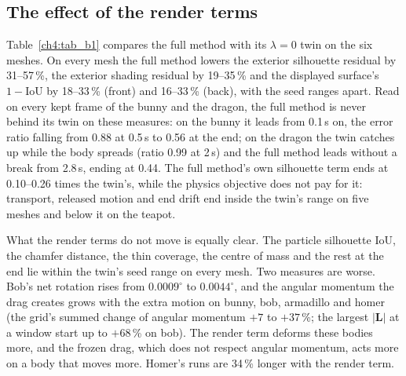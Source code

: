 \subsection{The effect of the render terms}
\label{ch4:sec_render_effect}
Table~\ref{ch4:tab_b1} compares the full method with its $\lambda=0$ twin on the six meshes. On every mesh the full
method lowers the exterior silhouette residual by 31--57\,\%, the exterior shading residual by 19--35\,\% and the
displayed surface's $1-\mathrm{IoU}$ by 18--33\,\% (front) and 16--33\,\% (back), with the seed ranges apart. Read on
every kept frame of the bunny and the dragon, the full method is never behind its twin on these measures: on the bunny
it leads from 0.1\,s on, the error ratio falling from 0.88 at 0.5\,s to 0.56 at the end; on the dragon the twin catches up
while the body spreads (ratio 0.99 at 2\,s) and the full method leads without a break from 2.8\,s, ending at 0.44. The
full method's own silhouette term ends at 0.10--0.26 times the twin's, while the physics objective does not pay for it:
transport, released motion and end drift end inside the twin's range on five meshes and below it on the teapot.

What the render terms do not move is equally clear. The particle silhouette IoU, the chamfer distance, the thin
coverage, the centre of mass and the rest at the end lie within the twin's seed range on every mesh. Two measures are
worse. Bob's net rotation rises from $0.0009^\circ$ to $0.0044^\circ$, and the angular momentum the drag creates grows
with the extra motion on bunny, bob, armadillo and homer (the grid's summed change of angular momentum $+7$ to
$+37$\,\%; the largest $\lvert\mathbf{L}\rvert$ at a window start up to $+68$\,\% on bob). The render term deforms these bodies more, and the frozen drag, which does not respect angular momentum,
acts more on a body that moves more. Homer's runs are 34\,\% longer with the render term.

